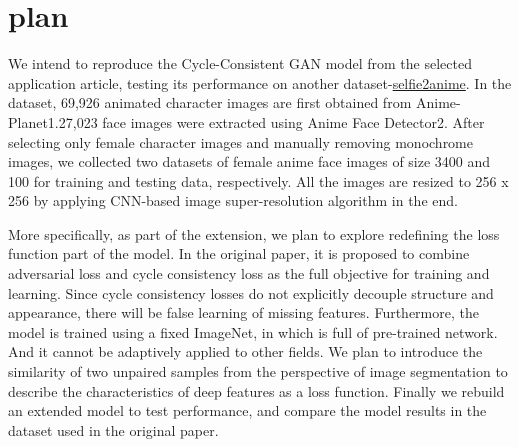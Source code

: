 \section{plan}

We intend to reproduce the Cycle-Consistent GAN model from the selected application article, testing its performance on another dataset-\href{https://paperswithcode.com/dataset/selfie2anime}{selfie2anime}.
In the dataset, 69,926 animated character images are first obtained from Anime-Planet1.27,023 face images were extracted using Anime Face Detector2. 
After selecting only female character images and manually removing monochrome images, we collected two datasets of female anime face images of size 3400 and 100 for training and testing data, respectively. 
All the images are resized to 256 x 256 by applying CNN-based image super-resolution algorithm in the end.

More specifically, as part of the extension, we plan to explore redefining the loss function part of the model. 
In the original paper, it is proposed to combine adversarial loss and cycle consistency loss as the full objective for training and learning. 
Since cycle consistency losses do not explicitly decouple structure and appearance, there will be false learning of missing features. 
Furthermore, the model is trained using a fixed ImageNet, in which is full of pre-trained network. 
And it cannot be adaptively applied to other fields. 
We plan to introduce the similarity of two unpaired samples from the perspective of image segmentation to describe the characteristics of deep features as a loss function. 
Finally we rebuild an extended model to test performance, and compare the model results in the dataset used in the original paper.
